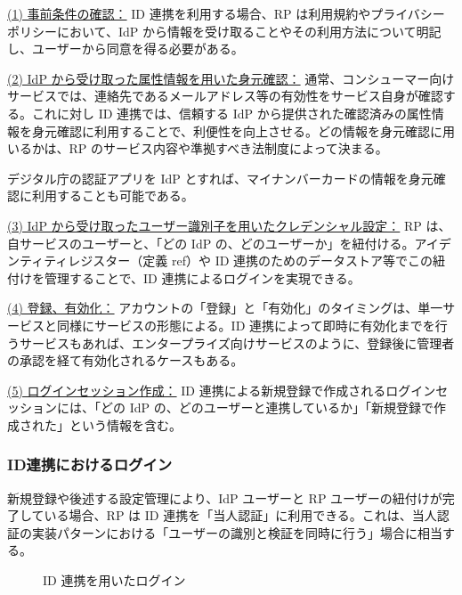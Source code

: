 \documentclass[uplatex]{jsarticle}
\def\ref#1{ref}%
\def\label#1{}%
\begin{document}
\underline{(1) 事前条件の確認：}
ID 連携を利用する場合、RP は利用規約やプライバシーポリシーにおいて、IdP から情報を受け取ることやその利用方法について明記し、ユーザーから同意を得る必要がある。

\underline{(2) IdP から受け取った属性情報を用いた身元確認：}
通常、コンシューマー向けサービスでは、連絡先であるメールアドレス等の有効性をサービス自身が確認する。これに対し ID 連携では、信頼する IdP から提供された確認済みの属性情報を身元確認に利用することで、利便性を向上させる。どの情報を身元確認に用いるかは、RP のサービス内容や準拠すべき法制度によって決まる。

\begin{exa}[マイナンバーカードの情報を用いた身元確認]\label{exa:ch4-mynumber-proofing}
デジタル庁の認証アプリを IdP とすれば、マイナンバーカードの情報を身元確認に利用することも可能である。
\end{exa}

\underline{(3) IdP から受け取ったユーザー識別子を用いたクレデンシャル設定：}
RP は、自サービスのユーザーと、「どの IdP の、どのユーザーか」を紐付ける。アイデンティティレジスター（定義 \ref{dfn:identity-register}）や ID 連携のためのデータストア等でこの紐付けを管理することで、ID 連携によるログインを実現できる。

\underline{(4) 登録、有効化：}
アカウントの「登録」と「有効化」のタイミングは、単一サービスと同様にサービスの形態による。ID 連携によって即時に有効化までを行うサービスもあれば、エンタープライズ向けサービスのように、登録後に管理者の承認を経て有効化されるケースもある。

\underline{(5) ログインセッション作成：}
ID 連携による新規登録で作成されるログインセッションには、「どの IdP の、どのユーザーと連携しているか」「新規登録で作成された」という情報を含む。

\subsubsection{ID連携におけるログイン}

新規登録や後述する設定管理により、IdP ユーザーと RP ユーザーの紐付けが完了している場合、RP は ID 連携を「当人認証」に利用できる。これは、当人認証の実装パターンにおける「ユーザーの識別と検証を同時に行う」場合に相当する。

\begin{figure}[H]
\centering
{}
\caption{ID 連携を用いたログイン}
\label{fig:ch4-federated-login}
\end{figure}
\end{document}

